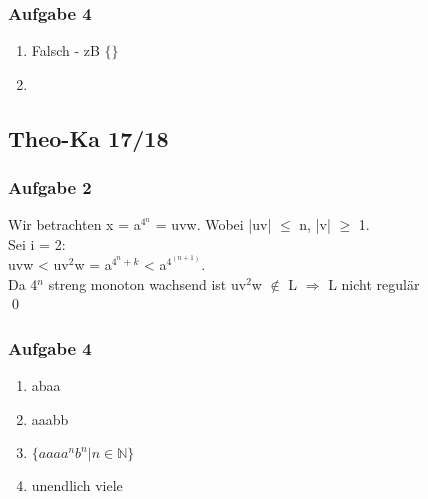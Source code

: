 \documentclass[12pt]{scrartcl}
\begin{document}
\subsubsection{Aufgabe 4}
	\begin{enumerate}
		\item Falsch - zB \(\{  \}\)
		\item 
	\end{enumerate}
\subsection{Theo-Ka 17/18}
	
\subsubsection{Aufgabe 2}
	Wir betrachten x = a$^{4{^n}}$ = uvw. Wobei |uv| $\le$ n, |v| $\ge$ 1. \\
	Sei i = 2:\\
	uvw < uv$^{2}$w = a$^{4^{n}+k}$ <  a$^{4^{(n+1)}}$. \\
	Da 4$^{n}$ streng monoton wachsend ist uv$^{2}$w $\notin$ L $\Rightarrow$ L nicht regulär \\
	\qed
\subsubsection{Aufgabe 4}
	\begin{enumerate}
		\item abaa
		\item aaabb
		\item \(\{aaaa^{n}b^{n}|n\in \mathbb{N}\}\)
		\item unendlich viele 
	\end{enumerate}
\end{document}
